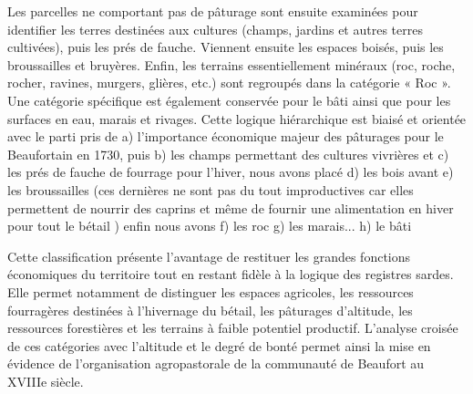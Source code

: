 Les parcelles ne comportant pas de pâturage sont ensuite examinées pour identifier les terres destinées aux cultures (champs, jardins et autres terres cultivées), puis les prés de fauche. Viennent ensuite les espaces boisés, puis les broussailles et bruyères. Enfin, les terrains essentiellement minéraux (roc, roche, rocher, ravines, murgers, glières, etc.) sont regroupés dans la catégorie « Roc ». Une catégorie spécifique est également conservée pour le bâti ainsi que pour les surfaces en eau, marais et rivages. Cette logique hiérarchique est biaisé et orientée avec le parti pris de a) l'importance économique majeur des pâturages pour le Beaufortain en 1730, puis b) les champs permettant des cultures vivrières et c) les prés de fauche de fourrage pour l'hiver, nous avons placé d) les bois avant e) les broussailles (ces dernières ne sont pas du tout improductives car elles permettent de nourrir des caprins et même de fournir une alimentation en hiver pour tout le bétail ) enfin nous avons f) les roc g) les marais... h) le bâti

Cette classification présente l'avantage de restituer les grandes fonctions économiques du territoire tout en restant fidèle à la logique des registres sardes. Elle permet notamment de distinguer les espaces agricoles, les ressources fourragères destinées à l'hivernage du bétail, les pâturages d'altitude, les ressources forestières et les terrains à faible potentiel productif. L'analyse croisée de ces catégories avec l'altitude et le degré de bonté permet ainsi la mise en évidence de l'organisation agropastorale de la communauté de Beaufort au XVIIIe siècle.










